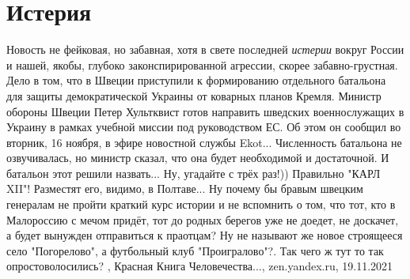  
 
 
 
 
\chapter{Истерия}

Новость не фейковая, но забавная, хотя в свете последней \emph{истерии} вокруг
России и нашей, якобы, глубоко законспирированной агрессии, скорее
забавно-грустная.  Дело в том, что в Швеции приступили к формированию
отдельного батальона для защиты демократической Украины от коварных планов
Кремля. Министр обороны Швеции Петер Хультквист готов направить шведских
военнослужащих в Украину в рамках учебной миссии под руководством ЕС. Об этом
он сообщил во вторник, 16 ноября, в эфире новостной службы Ekot... Численность
батальона не озвучивалась, но министр сказал, что она будет необходимой и
достаточной.  И батальон этот решили назвать... Ну, угадайте с трёх раз!))
Правильно "КАРЛ XII"! Разместят его, видимо, в Полтаве... Ну почему бы бравым
швецким генералам не пройти краткий курс истории и не вспомнить о том, что тот,
кто в Малороссию с мечом придёт, тот до родных берегов уже не доедет, не
доскачет, а будет вынужден отправиться к праотцам? Ну не называют же новое
строящееся село "Погорелово", а футбольный клуб "Проигралово"?. Так чего ж тут
то так опростоволосились?
, Красная Книга Человечества..., zen.yandex.ru, 19.11.2021
